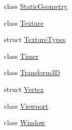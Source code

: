 \begin{DoxyCompactItemize}
\item 
class \mbox{\hyperlink{classec_1_1_static_geometry}{Static\+Geometry}}
\item 
class \mbox{\hyperlink{classec_1_1_texture}{Texture}}
\item 
struct \mbox{\hyperlink{structec_1_1_texture_types}{Texture\+Types}}
\item 
class \mbox{\hyperlink{classec_1_1_timer}{Timer}}
\item 
class \mbox{\hyperlink{classec_1_1_transform3_d}{Transform3D}}
\item 
struct \mbox{\hyperlink{structec_1_1_vertex}{Vertex}}
\item 
class \mbox{\hyperlink{classec_1_1_viewport}{Viewport}}
\item 
class \mbox{\hyperlink{classec_1_1_window}{Window}}
\end{DoxyCompactItemize}
